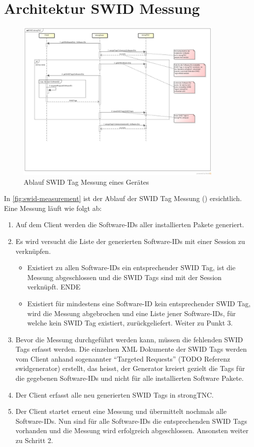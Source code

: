 \section{Architektur SWID Messung}
\begin{figure}[H]
\centering
\includegraphics[width=0.9\textwidth]{./images/architecture/SWID_strongTNC.png}
\caption{Ablauf SWID Tag Messung eines Gerätes}
\label{fig:swid-measurement}
\end{figure}
In \autoref{fig:swid-measurement} ist der Ablauf der SWID Tag Messung () ersichtlich.
Eine Messung läuft wie folgt ab:
\begin{enumerate}
\item Auf dem Client werden die Software-IDs aller installierten Pakete generiert. 
\item Es wird versucht die Liste der generierten Software-IDs mit einer Session zu verknüpfen.
	\begin{itemize}
	\item Existiert zu allen Software-IDs ein entsprechender SWID Tag, ist die Messung abgeschlossen und die SWID Tags sind mit der Session verknüpft. ENDE
	\item Existiert für mindestens eine Software-ID kein entsprechender SWID Tag, wird die Messung abgebrochen und eine Liste jener Software-IDs, für welche kein SWID Tag existiert, zurückgeliefert. Weiter zu Punkt 3.
	\end{itemize}
	\item Bevor die Messung durchgeführt werden kann, müssen die fehlenden SWID Tags
	erfasst werden. Die einzelnen XML Dokumente der SWID Tags werden vom Client
	anhand sogenannter \enquote{Targeted Requests} (TODO Referenz swidgenerator)
	erstellt, das heisst, der Generator kreiert gezielt die Tags für die gegebenen
	Software-IDs und nicht für alle installierten Software Pakete. \item Der Client
	erfasst alle neu generierten SWID Tags in strongTNC. \item Der Client startet
	erneut eine Messung und übermittelt nochmals alle Software-IDs. Nun sind für
	alle Software-IDs die entsprechenden SWID Tags vorhanden und die Messung wird
	erfolgreich abgeschlossen. Ansonsten weiter zu Schritt 2.
\end{enumerate}
